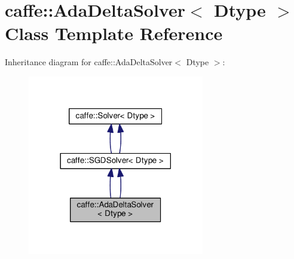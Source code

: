 \hypertarget{classcaffe_1_1_ada_delta_solver}{}\section{caffe\+:\+:Ada\+Delta\+Solver$<$ Dtype $>$ Class Template Reference}
\label{classcaffe_1_1_ada_delta_solver}


Inheritance diagram for caffe\+:\+:Ada\+Delta\+Solver$<$ Dtype $>$\+:
\nopagebreak
\begin{figure}[H]
\begin{center}
\leavevmode
\includegraphics[width=218pt]{classcaffe_1_1_ada_delta_solver__inherit__graph}
\end{center}
\end{figure}
